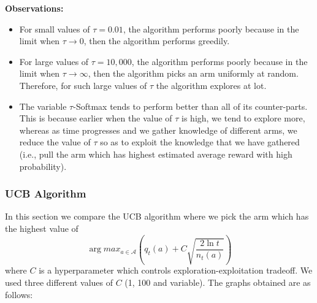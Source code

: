 \documentclass{article}
\begin{document}
		\textbf{Observations:}
		\begin{itemize}
			\item For small values of $\tau=0.01$, the algorithm performs poorly because in the limit when $\tau \to 0$, then the algorithm performs greedily.
			\item For large values of $\tau=10,000$, the algorithm performs poorly because in the limit when $\tau \to \infty$, then the algorithm picks an arm
				uniformly at random. Therefore, for such large values of $\tau$ the algorithm explores at lot.
			\item The variable $\tau$-Softmax tends to perform better than all of its counter-parts. This is because earlier when the value of $\tau$ is high, we
			tend to explore more, whereas as time progresses and we gather knowledge of different arms, we reduce the value of $\tau$ so as to exploit the knowledge
			that we have gathered (i.e., pull the arm which has highest estimated average reward with high probability).
		\end{itemize}
		
		
		\subsubsection{UCB Algorithm}
		In this section we compare the UCB algorithm where we pick the arm which has the highest value of 
		\begin{equation}
		\nonumber
			\arg max_{a \in \mathcal{A}} \left (q_{t}(a) + C\sqrt{\frac{2 \ln t}{n_{t}(a)}} \right )
		\end{equation}
		where $C$ is a hyperparameter which controls exploration-exploitation tradeoff. We used three different values of $C$ (1, 100 and variable). The graphs 
		obtained are as follows:
		
\end{document}
